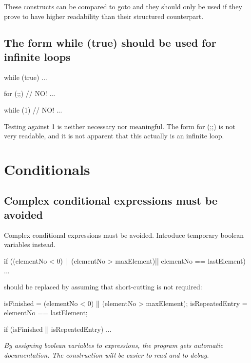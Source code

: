 \documentclass[a4paper,11pt,oneside]{scrbook}
\newcommand{\guideline}[1]{{\subsection{#1}}}
\newcommand{\motivation}[1]{{\normalfont \itshape #1}}
\newcommand{\trcode}[1]{{\normalfont \ttfamily #1}}
\begin{document}
These constructs can be compared to \trcode{goto} and they should only
be used if they prove to have higher readability than their structured
counterpart.

\guideline{The form \trcode{while (true)} should be used for infinite loops}

\begin{code}
  while (true) {
    ... 
  }

  for (;;) { // NO!
    ...
  }

  while (1) { // NO!
    ...
  }
\end{code}

Testing against 1 is neither necessary nor meaningful. The form for
(;;) is not very readable, and it is not apparent that this actually
is an infinite loop.

\section{Conditionals}

\guideline{Complex conditional expressions must be avoided}

Complex conditional expressions must be avoided. Introduce temporary
boolean variables instead.

\begin{code}
 if ((elementNo < 0) || (elementNo > maxElement)||
      elementNo == lastElement) {
    ...
  } 
\end{code}

should be replaced by assuming that short-cutting is not required: 

\begin{code}
  isFinished      = (elementNo < 0) || (elementNo > maxElement);
  isRepeatedEntry = elementNo == lastElement;

  if (isFinished || isRepeatedEntry) {
    ...
  } 
\end{code}

\motivation{
  By assigning boolean variables to expressions, the program gets
  automatic documentation. The construction will be easier to read and
  to debug.
}
\end{document}
